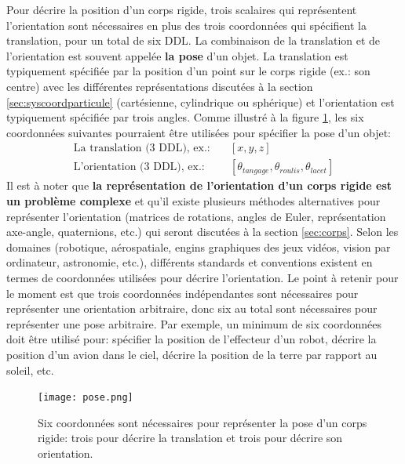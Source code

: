 Pour décrire la position d'un corps rigide, trois scalaires qui représentent l'orientation sont nécessaires en plus des trois coordonnées qui spécifient la translation, pour un total de six DDL. La combinaison de la translation et de l'orientation est souvent appelée \textbf{la pose} d'un objet. La translation est typiquement spécifiée par la position d'un point sur le corps rigide (ex.: son centre) avec les différentes représentations discutées à la section \ref{sec:syscoordparticule} (cartésienne, cylindrique ou sphérique) et l'orientation est typiquement spécifiée par trois angles. Comme illustré à la figure \ref{fig:pose}, les six coordonnées suivantes pourraient être utilisées pour spécifier la pose d'un objet:
\begin{align}
	\text{La translation (3 DDL), ex.:} \quad &\left[ x, y, z \right] \\
	\text{L'orientation (3 DDL), ex.:} \quad &\left[ \theta_{tangage}, \theta_{roulis}, \theta_{lacet} \right]
\end{align}
Il est à noter que \textbf{la représentation de l'orientation d'un corps rigide est un problème complexe} et qu'il existe plusieurs méthodes alternatives pour représenter l'orientation (matrices de rotations, angles de Euler, représentation axe-angle, quaternions, etc.) qui seront discutées à la section \ref{sec:corps}. Selon les domaines (robotique, aérospatiale, engins graphiques des jeux vidéos, vision par ordinateur, astronomie, etc.), différents standards et conventions existent en termes de coordonnées utilisées pour décrire l'orientation. Le point à retenir pour le moment est que trois coordonnées indépendantes sont nécessaires pour représenter une orientation arbitraire, donc six au total sont nécessaires pour représenter une pose arbitraire. Par exemple, un minimum de six coordonnées doit être utilisé pour: spécifier la position de l'effecteur d'un robot, décrire la position d'un avion dans le ciel, décrire la position de la terre par rapport au soleil, etc.

\begin{figure}[htbp]
	\centering
	\texttt{[image: pose.png]}
	\caption{Six coordonnées sont nécessaires pour représenter la pose d'un corps rigide: trois pour décrire la translation et trois pour décrire son orientation.}
	\label{fig:pose}
\end{figure}


